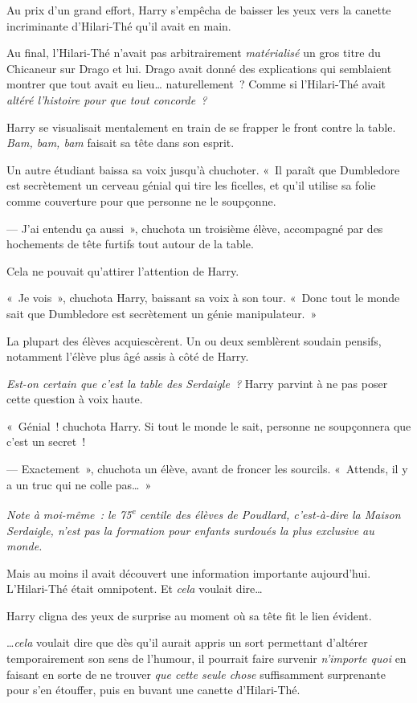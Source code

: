 Au prix d'un grand effort, Harry s'empêcha de baisser les yeux vers la canette incriminante d'Hilari-Thé qu'il avait en main.

Au final, l'Hilari-Thé n'avait pas arbitrairement \emph{matérialisé} un gros titre du Chicaneur sur Drago et lui.
Drago avait donné des explications qui semblaient montrer que tout avait eu lieu… naturellement~?
Comme si l'Hilari-Thé avait \emph{altéré l'histoire pour que tout concorde~?}

Harry se visualisait mentalement en train de se frapper le front contre la table.
\emph{Bam, bam, bam} faisait sa tête dans son esprit.

Un autre étudiant baissa sa voix jusqu'à chuchoter.
«~Il paraît que Dumbledore est secrètement un cerveau génial qui tire les ficelles, et qu'il utilise sa folie comme couverture pour que personne ne le soupçonne.

--- J'ai entendu ça aussi~», chuchota un troisième élève, accompagné par des hochements de tête furtifs tout autour de la table.

Cela ne pouvait qu'attirer l'attention de Harry.

«~Je vois~», chuchota Harry, baissant sa voix à son tour.
«~Donc tout le monde sait que Dumbledore est secrètement un génie manipulateur.~»

La plupart des élèves acquiescèrent.
Un ou deux semblèrent soudain pensifs, notamment l'élève plus âgé assis à côté de Harry.

\emph{Est-on certain que c'est la table des Serdaigle~?}
Harry parvint à ne pas poser cette question à voix haute.

«~Génial~! chuchota Harry. Si tout le monde le sait, personne ne soupçonnera que c'est un secret~!

--- Exactement~», chuchota un élève, avant de froncer les sourcils.
«~Attends, il y a un truc qui ne colle pas…~»

\emph{Note à moi-même~: le 75\textsuperscript{e} centile des élèves de Poudlard, c'est-à-dire la Maison Serdaigle, n'est pas la formation pour enfants surdoués la plus exclusive au monde.}

Mais au moins il avait découvert une information importante aujourd'hui.
L'Hilari-Thé était omnipotent.
Et \emph{cela} voulait dire…

Harry cligna des yeux de surprise au moment où sa tête fit le lien évident.

…\emph{cela} voulait dire que dès qu'il aurait appris un sort permettant d'altérer temporairement son sens de l'humour, il pourrait faire survenir \emph{n'importe quoi} en faisant en sorte de ne trouver \emph{que cette seule chose} suffisamment surprenante pour s'en étouffer, puis en buvant une canette d'Hilari-Thé.

